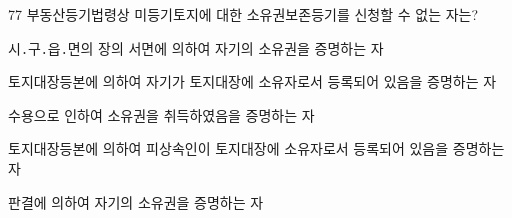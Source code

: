\begin{question}{77}
부동산등기법령상 미등기토지에 대한 소유권보존등기를 신청할 수 없는 자는?
\begin{choices}
  \item 시․구․읍․면의 장의 서면에 의하여 자기의 소유권을 증명하는 자
  \item 토지대장등본에 의하여 자기가 토지대장에 소유자로서 등록되어 있음을 증명하는 자
  \item 수용으로 인하여 소유권을 취득하였음을 증명하는 자
  \item 토지대장등본에 의하여 피상속인이 토지대장에 소유자로서 등록되어 있음을 증명하는 자
  \item 판결에 의하여 자기의 소유권을 증명하는 자
\end{choices}
\end{question}
